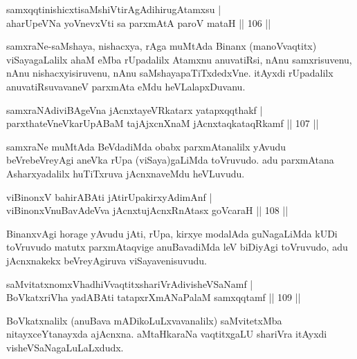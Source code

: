 \begin{shl}
samxqqtinishicxtisaMshiVtirAgAdihirugAtamxsu |\\
aharUpeVNa yoV\s nevxVti sa parxmAtA paroV mataH \hfill || 106 ||
\end{shl}

\begin{artha}%
samxraNe-saMshaya, nishacxya, rAga muMtAda Binanx (manoVvaqtitx) viSayagaLalilx ahaM eMba rUpadalilx Atamxnu anuvatiRsi, nAnu samxrisuvenu, nAnu nishacxyisiruvenu, nAnu saMshayapaTiTxdedxVne. itAyxdi rUpadalilx anuvatiRsuvavaneV parxmAta eMdu heVLalapxDuvanu.
\end{artha}


\begin{shl}
samxraNAdiviBAgeVna jAcnxtayeVRkatarx yatapxqqthakf |\\
parxthateV\s neVkarUpABaM tajAjxcnXnaM jAcnxtaqkataqRkamf \hfill || 107 ||
\end{shl}

\begin{artha}
samxraNe muMtAda BeVdadiMda obabx parxmAtanalilx yAvudu beVrebeVreyAgi aneVka rUpa (viSaya)gaLiMda toVruvudo. adu parxmAtana Asharxyadalilx huTiTxruva jAcnxnaveMdu heVLuvudu.
\end{artha}


\begin{shl}
viBinonxV bahirABAti jAtirUpakirxyAdimAnf |\\
viBinonxV\s nuBavAdeVva jAcnxtujAcnxRnAtasx goVcaraH \hfill || 108 ||
\end{shl}

\begin{artha}
BinanxvAgi horage yAvudu jAti, rUpa, kirxye modalAda guNagaLiMda kUDi toVruvudo matutx parxmAtaqvige anuBavadiMda leV biDiyAgi toVruvudo, adu jAcnxnakekx beVreyAgiruva viSayavenisuvudu.
\end{artha}


\begin{shl}
saMvitatxnomxVhadhiVvaqtitxshariVrAdivisheVSaNamf |\\
BoVkatxriVha yadABAti tatapxrXmANaPalaM samxqqtamf \hfill || 109 ||
\end{shl}

\begin{artha}
BoVkatxnalilx (anuBava mADikoLuLxvavanalilx) saMvitetxMba nitayxceYtanayxda ajAcnxna. aMtaHkaraNa vaqtitxgaLU shariVra itAyxdi visheVSaNagaLuLaLxdudx. 
\end{artha}

